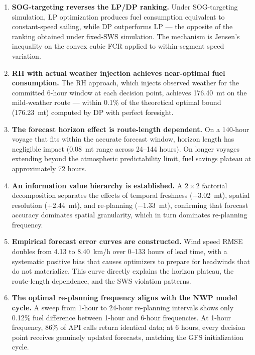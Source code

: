\documentclass[review]{elsarticle}
\begin{document}
\begin{enumerate}
    \item \textbf{SOG-targeting reverses the LP/DP ranking.} Under SOG-targeting simulation, LP optimization produces fuel consumption equivalent to constant-speed sailing, while DP outperforms LP --- the opposite of the ranking obtained under fixed-SWS simulation. The mechanism is Jensen's inequality on the convex cubic FCR applied to within-segment speed variation.

    \item \textbf{RH with actual weather injection achieves near-optimal fuel consumption.} The RH approach, which injects observed weather for the committed 6-hour window at each decision point, achieves 176.40~mt on the mild-weather route --- within 0.1\% of the theoretical optimal bound (176.23~mt) computed by DP with perfect foresight.

    \item \textbf{The forecast horizon effect is route-length dependent.} On a 140-hour voyage that fits within the accurate forecast window, horizon length has negligible impact (0.08~mt range across 24--144 hours). On longer voyages extending beyond the atmospheric predictability limit, fuel savings plateau at approximately 72 hours.

    \item \textbf{An information value hierarchy is established.} A $2 \times 2$ factorial decomposition separates the effects of temporal freshness (+3.02~mt), spatial resolution (+2.44~mt), and re-planning ($-$1.33~mt), confirming that forecast accuracy dominates spatial granularity, which in turn dominates re-planning frequency.

    \item \textbf{Empirical forecast error curves are constructed.} Wind speed RMSE doubles from 4.13 to 8.40~km/h over 0--133 hours of lead time, with a systematic positive bias that causes optimizers to prepare for headwinds that do not materialize. This curve directly explains the horizon plateau, the route-length dependence, and the SWS violation patterns.

    \item \textbf{The optimal re-planning frequency aligns with the NWP model cycle.} A sweep from 1-hour to 24-hour re-planning intervals shows only 0.12\% fuel difference between 1-hour and 6-hour frequencies. At 1-hour frequency, 86\% of API calls return identical data; at 6 hours, every decision point receives genuinely updated forecasts, matching the GFS initialization cycle.
\end{enumerate}
\end{document}
